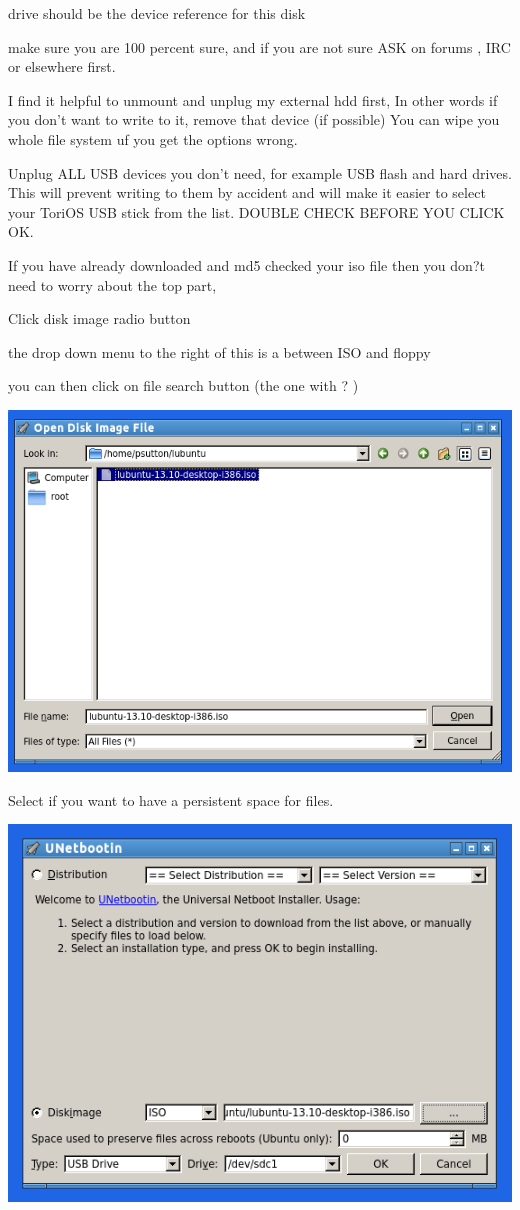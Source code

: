 \documentclass[12pt,a4paper]{book}
\begin{document}
drive should be the device reference for this disk

make sure you are 100 percent sure,  and if you are not sure ASK on forums , IRC or elsewhere first.

I find it helpful to unmount and unplug my external hdd first,  In other words if you don't want to write to it,  remove that device (if possible)  You can wipe you whole file system uf you get the options wrong. 

Unplug ALL USB devices you don't need, for example USB flash and hard drives. This will prevent writing to them by accident and will make it easier to select your ToriOS  USB stick from the list.  DOUBLE CHECK BEFORE YOU CLICK OK. 

If you have already downloaded and md5 checked your iso file then you don?t need to worry about the top part,

Click disk image radio button

the drop down menu to the right of this is a between ISO and floppy

you can then click on file search button (the one with ? )
\begin{center}
\includegraphics[width=0.7\linewidth]{unetbootin2} 

\end{center}



Select if you want to have a persistent space for files.


\begin{center}
\includegraphics[width=0.7\linewidth]{unetbootin3}
\end{center}
\end{document}
